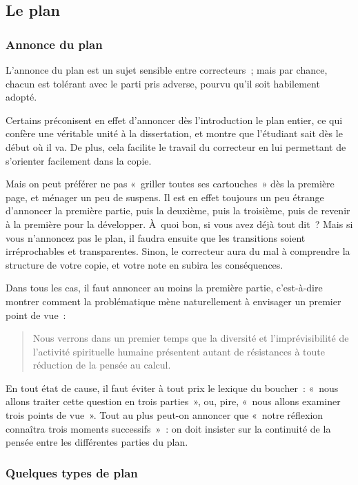 \documentclass[a4paper,12pt]{article}
\begin{document}
\subsection{Le plan}
\label{sec-2-4}

\subsubsection{Annonce du plan}
\label{sec-2-4-1}
L'annonce du plan est un sujet sensible entre correcteurs ; mais par
chance, chacun est tolérant avec le parti pris adverse, pourvu qu'il
soit habilement adopté.

Certains préconisent en effet d'annoncer dès l'introduction le plan
entier, ce qui confère une véritable unité à la dissertation, et montre
que l'étudiant sait dès le début où il va. De plus, cela facilite le
travail du correcteur en lui permettant de s'orienter facilement dans la
copie.

Mais on peut préférer ne pas « griller toutes ses cartouches » dès la
première page, et ménager un peu de suspens. Il est en effet toujours un
peu étrange d'annoncer la première partie, puis la deuxième, puis la
troisième, puis de revenir à la première pour la développer. À quoi bon,
si vous avez déjà tout dit ? Mais si vous n'annoncez pas le plan, il
faudra ensuite que les transitions soient irréprochables et
transparentes. Sinon, le correcteur aura du mal à comprendre la
structure de votre copie, et votre note en subira les conséquences.

Dans tous les cas, il faut annoncer au moins la première partie,
c'est-à-dire montrer comment la problématique mène naturellement à
envisager un premier point de vue :

\begin{quote}
Nous verrons dans un premier temps que la diversité et
l'imprévisibilité de l'activité spirituelle humaine présentent autant
de résistances à toute réduction de la pensée au calcul.
\end{quote}

En tout état de cause, il faut éviter à tout prix le lexique du
boucher : « nous allons traiter cette question en trois parties », ou,
pire, « nous allons examiner trois points de vue ». Tout au plus peut-on
annoncer que « notre réflexion connaîtra trois moments successifs » : on
doit insister sur la continuité de la pensée entre les différentes
parties du plan.

\subsubsection{Quelques types de plan}
\label{sec-2-4-2}
\end{document}
